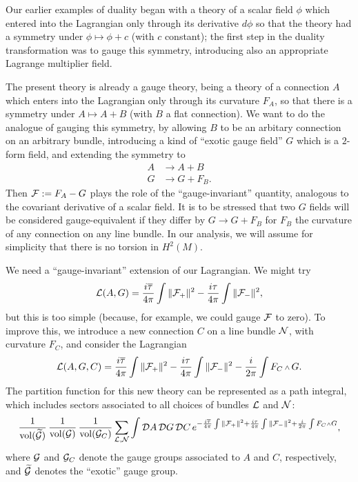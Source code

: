 Our earlier examples of duality began with a theory of a scalar field
$\phi$ which entered into the Lagrangian only through its derivative
$d\phi$ so that the theory had a symmetry under $\phi\mapsto \phi+c$ (with
$c$ constant); the first step in the duality transformation was to gauge
this symmetry, introducing also an appropriate Lagrange multiplier field.

The present theory is already a gauge theory, being a theory of a
connection $A$ which enters into the Lagrangian only through its curvature
$F_A$, so that there is a symmetry under $A\mapsto A+B$ (with $B$ a flat
connection).  We want to do the analogue of gauging this symmetry, by
allowing $B$ to be an arbitary connection on an arbitrary bundle,
introducing a kind of ``exotic gauge field'' $G$ which is a $2$-form field,
and extending the symmetry to
\begin{equation}
\begin{aligned}
A&\to A+B\\ G&\to G+F_B.
\end{aligned}
\end{equation}
Then ${\cal F}:=F_A-G$ plays the role of the ``gauge-invariant'' quantity,
analogous to the covariant derivative of a scalar field.
It is to be stressed that two $G$ fields will be considered gauge-equivalent
if they differ by $G\to G+F_B$ for $F_B$ the curvature of any connection
on any line bundle.  In our analysis, we will assume
for simplicity that there is no torsion in $H^2(M)$.


We need a ``gauge-invariant'' extension of our Lagrangian.  We might try
\begin{equation}
{\cal L}(A,G)=\frac{i\overline{\tau}}{4\pi}\int
\|{\cal F}_+\|^2-\frac{i\tau}{4\pi}\int\|{\cal F}_-\|^2,
\end{equation}
but this is too simple (because, for example, we could gauge ${\cal F}$ to zero).
To improve this, we introduce a new connection $C$ on a line bundle ${\cal N}$,
with curvature $F_C$,
and consider the Lagrangian
\begin{equation}
\lg(A,G,C)=\frac{i\overline{\tau}}{4\pi}\int
\|\cF_+\|^2-\frac{i\tau}{4\pi}\int\|\cF_-\|^2 -\frac{i}{2\pi}\int
F_C\wdg G.
\end{equation}
The partition function for this new theory can be represented as a path
integral,
which includes sectors associated to all choices of
bundles ${\cal L}$ and ${\cal N}$:
\begin{equation}\label{pathbig}
\frac1{\vol(\widetilde{\cG})}\,\frac1{\vol(\cG)}\,\frac1{\vol(\cG_C)}
\sum_{\lb,\lbn} \int\cD A\,\cD G\,\cD C\,
e^{-\frac{i\overline{\tau}}{4\pi}\int
\|\cF_+\|^2+\frac{i\tau}{4\pi}\int\|\cF_-\|^2 +\frac{i}{2\pi}\int
F_C\wdg G},
\end{equation}
where ${\cal G}$ and ${\cal G}_C$ denote the gauge groups associated to $A$ and $C$,
respectively, and $\widetilde{{\cal G}}$ denotes the ``exotic'' gauge group.

